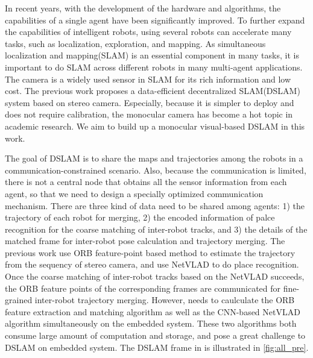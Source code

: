 \label{sec:introdutction}
In recent years, with the development of the hardware and algorithms, the capabilities of a single agent have been significantly improved.
To further expand the capabilities of intelligent robots, using several robots can accelerate many tasks, such as localization, exploration, and mapping.
As simultaneous localization and mapping(SLAM) is an essential component in many tasks, it is important to do SLAM across different robots in many multi-agent applications.
The camera is a widely used sensor in SLAM for its rich information and low cost. The previous work \cite{Cieslewski:20187ee} proposes a data-efficient decentralized SLAM(DSLAM) system based on stereo camera.
Especially, because it is simpler to deploy and does not require calibration, the monocular camera has become a hot topic in academic research. We aim to build up a monocular visual-based DSLAM in this work.

The goal of DSLAM is to share the maps and trajectories among the robots in a communication-constrained scenario. Also, because the communication is limited, there is not a central node that obtains all the sensor information from each agent, so that we need to design a specially optimized communication mechanism. There are three kind of data need to be shared among agents: 1) the trajectory of each robot for merging, 2) the encoded information of palce recognition for the coarse matching of inter-robot tracks, and 3) the details of the matched frame for inter-robot pose calculation and trajectory merging. The previous work \cite{Cieslewski:20187ee} use ORB feature-point based method to estimate the trajectory from the sequency of stereo camera, and use NetVLAD \cite{Arandjelovic:2017997} to do place recognition. Once the coarse matching of inter-robot tracks based on the NetVLAD succeeds, the ORB feature points of the corresponding frames are communicated for fine-grained inter-robot trajectory merging. However, \cite{Cieslewski:20187ee} needs to caulculate the ORB feature extraction and matching algorithm as well as the CNN-based NetVLAD algorithm simultaneously on the embedded system. These two algorithms both consume large amount of computation and storage, and pose a great challenge to DSLAM on embedded system. The DSLAM frame in \cite{Cieslewski:20187ee} is illustrated in \cref{fig:all_pre}.

